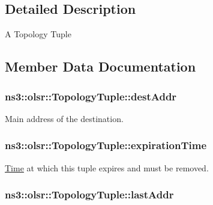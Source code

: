 \subsection{Detailed Description}
A Topology Tuple 

\subsection{Member Data Documentation}
\subsubsection[{\texorpdfstring{dest\+Addr}{destAddr}}]{ ns3\+::olsr\+::\+Topology\+Tuple\+::dest\+Addr}\hypertarget{structns3_1_1olsr_1_1TopologyTuple_a2e7a724a86c97221f9c5f3baacee0eba}{}\label{structns3_1_1olsr_1_1TopologyTuple_a2e7a724a86c97221f9c5f3baacee0eba}


Main address of the destination. 

\subsubsection[{\texorpdfstring{expiration\+Time}{expirationTime}}]{ ns3\+::olsr\+::\+Topology\+Tuple\+::expiration\+Time}\hypertarget{structns3_1_1olsr_1_1TopologyTuple_ac567bb92fd21ca445e202dcec2538ecb}{}\label{structns3_1_1olsr_1_1TopologyTuple_ac567bb92fd21ca445e202dcec2538ecb}


\hyperlink{classns3_1_1Time}{Time} at which this tuple expires and must be removed. 

\subsubsection[{\texorpdfstring{last\+Addr}{lastAddr}}]{ ns3\+::olsr\+::\+Topology\+Tuple\+::last\+Addr}\hypertarget{structns3_1_1olsr_1_1TopologyTuple_a59d9c733056432b9de9f8becdd9e640d}{}\label{structns3_1_1olsr_1_1TopologyTuple_a59d9c733056432b9de9f8becdd9e640d}


